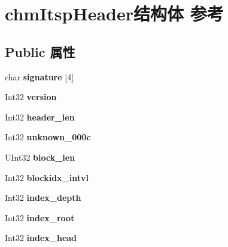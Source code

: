 \hypertarget{structchm_itsp_header}{}\section{chm\+Itsp\+Header结构体 参考}
\label{structchm_itsp_header}
\subsection*{Public 属性}
\begin{DoxyCompactItemize}
\item 
\mbox{\label{structchm_itsp_header_a423b6dea49806bd0bcf63569add50311}} 
char {\bfseries signature} \mbox{[}4\mbox{]}
\item 
\mbox{\label{structchm_itsp_header_a4d766ae8075edafff0de751b9d5c846c}} 
Int32 {\bfseries version}
\item 
\mbox{\label{structchm_itsp_header_ab69e50e449df26bf3c991015c9c92724}} 
Int32 {\bfseries header\+\_\+len}
\item 
\mbox{\label{structchm_itsp_header_a12769ff9ce8d467bd2e5b074347b034d}} 
Int32 {\bfseries unknown\+\_\+000c}
\item 
\mbox{\label{structchm_itsp_header_a1d3618294adb184a1e4f501d2b3ecb00}} 
U\+Int32 {\bfseries block\+\_\+len}
\item 
\mbox{\label{structchm_itsp_header_acb8d8afa2243d8371ee8ac02a127aae3}} 
Int32 {\bfseries blockidx\+\_\+intvl}
\item 
\mbox{\label{structchm_itsp_header_a9115bcdd1ab729958944de1e861983fd}} 
Int32 {\bfseries index\+\_\+depth}
\item 
\mbox{\label{structchm_itsp_header_ab45fd2a0bf48a00461caa044bd3876a2}} 
Int32 {\bfseries index\+\_\+root}
\item 
\mbox{\label{structchm_itsp_header_aaf33747013bcf4c0a760ef8ccb38bfab}} 
Int32 {\bfseries index\+\_\+head}
\item 

\end{DoxyCompactItemize}
